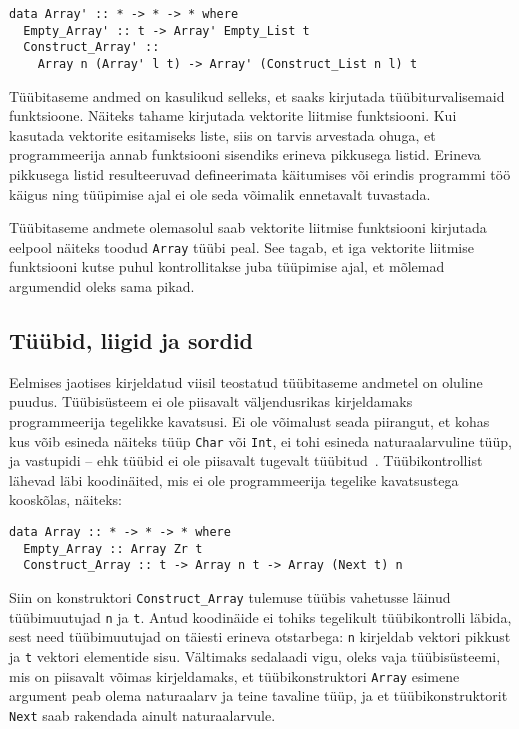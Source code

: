 \documentclass[12pt]{article}
\begin{document}
      \begin{verbatim}data Array' :: * -> * -> * where
  Empty_Array' :: t -> Array' Empty_List t
  Construct_Array' ::
    Array n (Array' l t) -> Array' (Construct_List n l) t\end{verbatim}

      Tüübitaseme andmed on kasulikud selleks, et saaks kirjutada tüübiturvalisemaid funktsioone. Näiteks tahame kirjutada vektorite liitmise funktsiooni. Kui kasutada vektorite esitamiseks liste, siis on tarvis arvestada ohuga, et programmeerija annab funktsiooni sisendiks erineva pikkusega listid. Erineva pikkusega listid resulteeruvad defineerimata käitumises või erindis programmi töö käigus ning tüüpimise ajal ei ole seda võimalik ennetavalt tuvastada.

      Tüübitaseme andmete olemasolul saab vektorite liitmise funktsiooni kirjutada eelpool näiteks toodud \verb!Array! tüübi peal. See tagab, et iga vektorite liitmise funktsiooni kutse puhul kontrollitakse juba tüüpimise ajal, et mõlemad argumendid oleks sama pikad.
    \subsection{Tüübid, liigid ja sordid}\label{liiksort}
      Eelmises jaotises kirjeldatud viisil teostatud tüübitaseme andmetel on oluline puudus. Tüübisüsteem ei ole piisavalt väljendusrikas kirjeldamaks programmeerija tegelikke kavatsusi. Ei ole võimalust seada piirangut, et kohas kus võib esineda näiteks tüüp \verb!Char! või \verb!Int!, ei tohi esineda naturaalarvuline tüüp, ja vastupidi -- ehk tüübid ei ole piisavalt tugevalt tüübitud~\cite{Giv}. Tüübikontrollist lähevad läbi koodinäited, mis ei ole programmeerija tegelike kavatsustega kooskõlas, näiteks:

      \begin{verbatim}data Array :: * -> * -> * where
  Empty_Array :: Array Zr t
  Construct_Array :: t -> Array n t -> Array (Next t) n\end{verbatim}

      Siin on konstruktori \verb!Construct_Array! tulemuse tüübis vahetusse läinud tüübimuutujad \verb!n! ja \verb!t!. Antud koodinäide ei tohiks tegelikult tüübikontrolli läbida, sest need tüübimuutujad on täiesti erineva otstarbega: \verb!n! kirjeldab vektori pikkust ja \verb!t! vektori elementide sisu. Vältimaks sedalaadi vigu, oleks vaja tüübisüsteemi, mis on piisavalt võimas kirjeldamaks, et tüübikonstruktori \verb!Array! esimene argument peab olema naturaalarv ja teine tavaline tüüp, ja et tüübikonstruktorit \verb!Next! saab rakendada ainult naturaalarvule.
\end{document}
